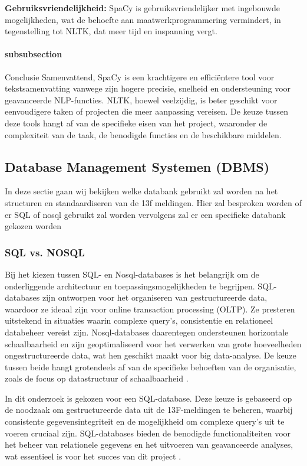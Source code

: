 \textbf{Gebruiksvriendelijkheid:} SpaCy is gebruiksvriendelijker met ingebouwde mogelijkheden, wat de behoefte aan maatwerkprogrammering vermindert, in tegenstelling tot NLTK, dat meer tijd en inspanning vergt.

\paragraph{subsubsection}{Conclusie}
Samenvattend, SpaCy is een krachtigere en efficiëntere tool voor tekstsamenvatting vanwege zijn hogere precisie, snelheid en ondersteuning voor geavanceerde NLP-functies. NLTK, hoewel veelzijdig, is beter geschikt voor eenvoudigere taken of projecten die meer aanpassing vereisen. De keuze tussen deze tools hangt af van de specifieke eisen van het project, waaronder de complexiteit van de taak, de benodigde functies en de beschikbare middelen.


\subsection{Database Management Systemen (DBMS)}
In deze sectie gaan wij bekijken welke databank gebruikt zal worden na het structuren en standaardiseren van de 13f meldingen. Hier zal besproken worden of er SQL of nosql gebruikt zal worden vervolgens zal er een specifieke databank gekozen worden
\subsubsection{SQL vs. NOSQL}
Bij het kiezen tussen SQL- en Nosql-databases is het belangrijk om de onderliggende architectuur en toepassingsmogelijkheden te begrijpen. SQL-databases zijn ontworpen voor het organiseren van gestructureerde data, waardoor ze ideaal zijn voor online transaction processing (OLTP). Ze presteren uitstekend in situaties waarin complexe query’s, consistentie en relationeel databeheer vereist zijn. Nosql-databases daarentegen ondersteunen horizontale schaalbaarheid en zijn geoptimaliseerd voor het verwerken van grote hoeveelheden ongestructureerde data, wat hen geschikt maakt voor big data-analyse. De keuze tussen beide hangt grotendeels af van de specifieke behoeften van de organisatie, zoals de focus op datastructuur of schaalbaarheid \autocite{khan2023performance}.

In dit onderzoek is gekozen voor een SQL-database. Deze keuze is gebaseerd op de noodzaak om gestructureerde data uit de 13F-meldingen te beheren, waarbij consistente gegevensintegriteit en de mogelijkheid om complexe query’s uit te voeren cruciaal zijn. SQL-databases bieden de benodigde functionaliteiten voor het beheer van relationele gegevens en het uitvoeren van geavanceerde analyses, wat essentieel is voor het succes van dit project \autocite{khan2023performance}.

